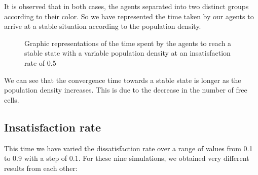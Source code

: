 \documentclass[a4paper, 12pt]{report}
\begin{document}
\newpage

It is observed that in both cases, the agents separated into two distinct groups according to their color. So we have
represented the time taken by our agents to arrive at a stable situation according to the population density.

\begin{figure}[!h]
	\centering
	\caption{Graphic representations of the time spent by the agents to reach a stable state with a variable population density at an insatisfaction rate of 0.5}
\end{figure}

\newpage

We can see that the convergence time towards a stable state is longer as the population density increases. This is due to the decrease in the number of
free cells.

\subsection{Insatisfaction rate}

This time we have varied the dissatisfaction rate over a range of values from 0.1 to 0.9 with a step of 0.1. For these nine simulations, we obtained
very different results from each other:

\begin{figure}[!h]
	\centering
\end{figure}
\end{document}

